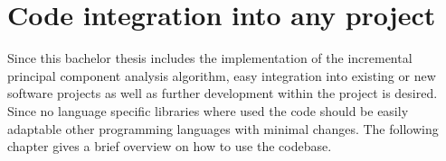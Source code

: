 \section{Code integration into any project}
Since this bachelor thesis includes the implementation of the incremental principal component analysis algorithm, easy integration into existing or new software projects as well as further development within the project is desired. Since no language specific libraries where used the code should be easily adaptable other programming languages with minimal changes. The following chapter gives a brief overview on how to use the codebase.



